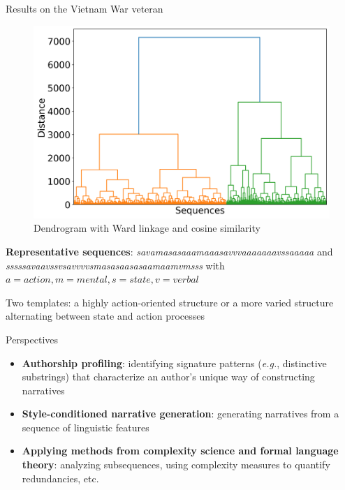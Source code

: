 \documentclass[handout,10pt]{beamer}
\begin{document}
\begin{frame}{Results on the Vietnam War veteran}

\begin{figure}
    \centering
    \includegraphics[width=0.55\linewidth]{img/dendogram_viet.png}
    \caption{Dendrogram with Ward linkage and cosine similarity}%
    \label{fig:dendogram}
\end{figure}

\vspace{0.25cm}
\pause

\textbf{Representative sequences}: \textit{savamasasaaamaaasavvvaaaaaaavssaaaaa} and \textit{sssssavaavssvsavvvvsmasasaasasaamaamvmsss} with $a=action, m=mental, s=state, v=verbal$

\vspace{0.25cm}
\pause

Two templates: a highly action-oriented structure or a more varied structure alternating between state and action processes
    
\end{frame}

\begin{frame}{Perspectives}

\begin{itemize}[<+->]
    \item \textbf{Authorship profiling}: identifying signature patterns (\textit{e.g.}, distinctive substrings) that characterize an author's unique way of constructing narratives
    \item \textbf{Style-conditioned narrative generation}: generating narratives from a sequence of linguistic features
    \item \textbf{Applying methods from complexity science and formal language theory}: analyzing subsequences, using complexity measures to quantify redundancies, etc.
\end{itemize}

\end{frame}
\end{document}
